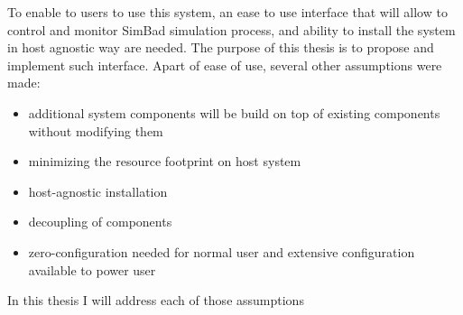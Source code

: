 To enable to users to use this system, an ease to use interface that will allow to control and monitor SimBad simulation process, and ability to install the system in host agnostic way are needed. The purpose of this thesis is to propose and implement such interface. 
Apart of ease of use, several other assumptions were made:
\begin{itemize}
    \item additional system components will be build on top of existing components without modifying them
    \item minimizing the resource footprint on host system
    \item host-agnostic installation
    \item decoupling of components
    \item zero-configuration needed for normal user and extensive configuration available to power user
\end{itemize}
In this thesis I will address each of those assumptions